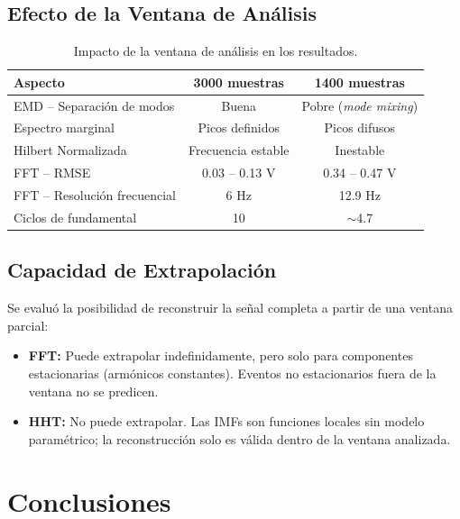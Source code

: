 \documentclass[12pt,a4paper]{article}
\begin{document}
\subsection{Efecto de la Ventana de Análisis}

\begin{table}[H]
\centering
\caption{Impacto de la ventana de análisis en los resultados.}
\begin{tabular}{@{}lcc@{}}
\toprule
\textbf{Aspecto} & \textbf{3000 muestras} & \textbf{1400 muestras} \\
\midrule
EMD -- Separación de modos & Buena & Pobre (\textit{mode mixing}) \\
Espectro marginal & Picos definidos & Picos difusos \\
Hilbert Normalizada & Frecuencia estable & Inestable \\
FFT -- RMSE & 0.03 -- 0.13 V & 0.34 -- 0.47 V \\
FFT -- Resolución frecuencial & 6 Hz & 12.9 Hz \\
Ciclos de fundamental & 10 & $\sim$4.7 \\
\bottomrule
\end{tabular}
\label{tab:efecto_ventana}
\end{table}


\subsection{Capacidad de Extrapolación}

Se evaluó la posibilidad de reconstruir la señal completa a partir de una ventana parcial:

\begin{itemize}
    \item \textbf{FFT:} Puede extrapolar indefinidamente, pero solo para componentes estacionarias (armónicos constantes). Eventos no estacionarios fuera de la ventana no se predicen.
    \item \textbf{HHT:} No puede extrapolar. Las IMFs son funciones locales sin modelo paramétrico; la reconstrucción solo es válida dentro de la ventana analizada.
\end{itemize}

\section{Conclusiones}
\end{document}
